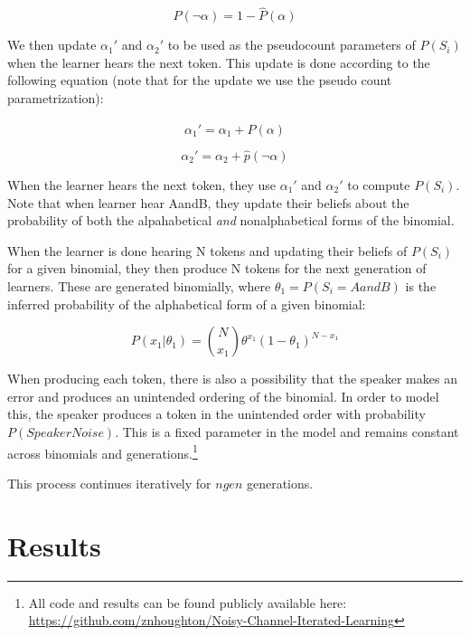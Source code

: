 \documentclass[10pt, letterpaper]{article}
\begin{document}
\begin{equation}
\label{eq:phatnotalpha}
\hat{P}(\neg\alpha) = 1 - \hat{P}(\alpha)
\end{equation}

We then update \(\alpha_1'\) and \(\alpha_2'\) to be used as the
pseudocount parameters of \(P(S_i)\) when the learner hears the next
token. This update is done according to the following equation (note
that for the update we use the pseudo count parametrization):

\begin{equation}
\label{eq:alpha1}
\alpha_1' = \alpha_1 + \hat{P}(\alpha)
\end{equation}

\begin{equation}
\label{eq:alpha2}
\alpha_2' = \alpha_2 + \hat{p}(\neg\alpha)
\end{equation}

When the learner hears the next token, they use \(\alpha_1'\) and
\(\alpha_2'\) to compute \(P(S_i)\). Note that when learner hear AandB,
they update their beliefs about the probability of both the
alpahabetical \emph{and} nonalphabetical forms of the binomial.

When the learner is done hearing N tokens and updating their beliefs of
\(P(S_i)\) for a given binomial, they then produce N tokens for the next
generation of learners. These are generated binomially, where
\(\theta_1 = P(S_i=AandB)\) is the inferred probability of the
alphabetical form of a given binomial:

\begin{equation}
\label{eq:binomialProd}
P(x_1|\theta_1) = \binom{N}{x_1} \theta^{x_1} (1-\theta_1)^{N-x_1}
\end{equation}

When producing each token, there is also a possibility that the speaker
makes an error and produces an unintended ordering of the binomial. In
order to model this, the speaker produces a token in the unintended
order with probability \(P(SpeakerNoise)\). This is a fixed parameter in
the model and remains constant across binomials and
generations.\footnote{All code and results can be found publicly
  available here:
  \url{https://github.com/znhoughton/Noisy-Channel-Iterated-Learning}}

This process continues iteratively for \(ngen\) generations.

\hypertarget{results}{%
\section{Results}\label{results}}
\end{document}
